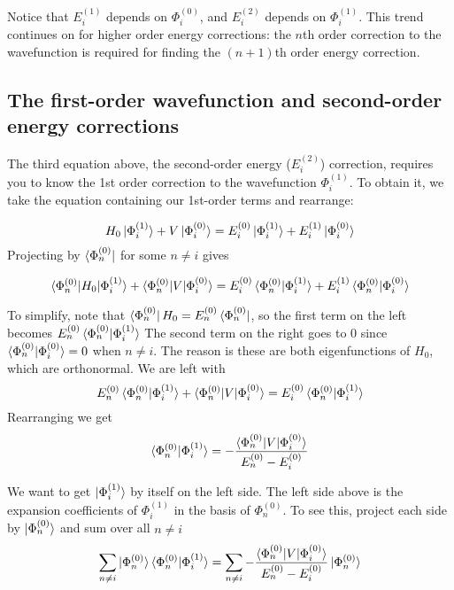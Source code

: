 \documentclass{article}
\newcommand{\Ezero}{E^{(0)}}
\newcommand{\Phizero}{\Phi^{(0)}}
\newcommand{\Eone}{E^{(1)}}
\newcommand{\Phione}{\Phi^{(1)}}
\begin{document}
Notice that $E_i^{(1)}$ depends on $\Phi_i^{(0)}$, and $E_i^{(2)}$ depends on $\Phi_i^{(1)}$.
This trend continues on for higher order energy corrections: 
    the $n$th order correction to the wavefunction is required for finding the $(n+1)$th order energy correction.

\subsection{The first-order wavefunction and second-order energy corrections}
The third equation above, the second-order energy ($E_i^{(2)}$) correction, requires you to know the 1st order correction to the wavefunction $\Phione_i$.
To obtain it, we take the equation containing our 1st-order terms and rearrange:

\[ H_0\ket{\Phione_i} + V \ket{\Phizero_i} = \Ezero_i \ket{\Phione_i} + \Eone_i \ket{\Phizero_i} \]
Projecting by $\bra{\Phizero_n}$ for some $n \neq i$ gives 

\[ \braket{\Phizero_n | H_0 | \Phione_i} + \braket{ \Phizero_n | V | \Phizero_i} = \Ezero_i \braket{\Phizero_n|\Phione_i} + \Eone_i \braket{\Phizero_n | \Phizero_i} \]

To simplify, note that $\bra{\Phizero_n} H_0 = \Ezero_n \bra{\Phizero_n}$, so the first term on the left becomes $\Ezero_n \braket{\Phizero_n | \Phione_i} $
The second term on the right goes to 0 since $\braket{\Phizero_n|\Phizero_i} = 0 $ when $n \neq i$. 
The reason is these are both eigenfunctions of $H_0$, which are orthonormal.
We are left with
\[ \Ezero_n \braket{ \Phizero_n | \Phione_i} + \braket{ \Phizero_n | V | \Phizero_i} = \Ezero_i \braket{ \Phizero_n | \Phione_i }    \]
Rearranging we get
\[ \braket{\Phizero_n | \Phione_i } = -\frac{ \braket{ \Phizero_n | V | \Phizero_i} }{ \Ezero_n - \Ezero_i} \]

We want to get $\ket{\Phione_i}$ by itself on the left side.
The left side above is the expansion coefficients of $ \Phione_i$ in the basis of $\Phizero_n$.
To see this, project each side by $ \ket{\Phizero_n} $ and sum over all $n \neq i$
\[ \sum_{n \neq i} \ket{ \Phizero_n} \braket{\Phizero_n | \Phione_i } = \sum_{n \neq i} -\frac{ \braket{ \Phizero_n | V | \Phizero_i} }{ \Ezero_n - \Ezero_i} \ket{\Phizero_n} \]
\end{document}
